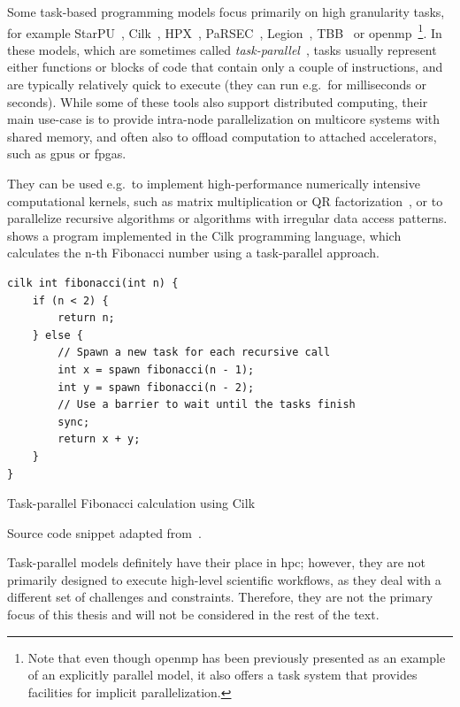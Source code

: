 Some task-based programming models focus primarily on high granularity tasks, for example
StarPU~\cite{starpu}, Cilk~\cite{cilk}, HPX~\cite{hpx},
PaRSEC~\cite{parsec}, Legion~\cite{legion}, TBB~\cite{tbb} or
\gls{openmp}~\cite{openmp}\footnote{Note that even though \gls{openmp} has been previously presented as an example of an
explicitly parallel model, it also offers a task system that provides facilities for implicit parallelization.}. In these models, which are
sometimes called \emph{task-parallel}~\cite{task_based_taxonomy}, tasks usually represent either
functions or blocks of code that contain only a couple of instructions, and are typically
relatively quick to execute (they can run e.g.\ for milliseconds or seconds). While some of these
tools also support distributed computing, their main use-case is to provide intra-node
parallelization on multicore systems with shared memory, and often also to offload computation to
attached accelerators, such as \glspl{gpu} or \glspl{fpga}.

They can be used e.g.\ to implement high-performance numerically intensive computational kernels,
such as matrix multiplication or QR factorization~\cite{qr_factorization}, or to parallelize
recursive algorithms or algorithms with irregular data access patterns. 
shows a program implemented in the Cilk programming language, which calculates the n-th Fibonacci
number using a task-parallel approach.

\begin{listing}
	\begin{verbatim}
cilk int fibonacci(int n) {
	if (n < 2) {
		return n;
	} else {
		// Spawn a new task for each recursive call
		int x = spawn fibonacci(n - 1);
		int y = spawn fibonacci(n - 2);
		// Use a barrier to wait until the tasks finish
		sync;
		return x + y;
	}
}
	\end{verbatim}
	\caption{Task-parallel Fibonacci calculation using Cilk}
	\centering Source code snippet adapted from~\cite{cilk}.
	\label{lst:cilk-fibonacci}
\end{listing}

Task-parallel models definitely have their place in \gls{hpc}; however, they are not
primarily designed to execute high-level scientific workflows, as they deal with a different set of
challenges and constraints. Therefore, they are not the primary focus of this thesis and will not
be considered in the rest of the text.

